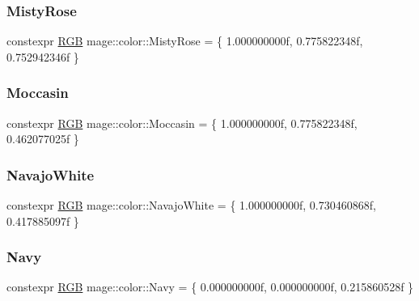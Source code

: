 \mbox{\label{namespacemage_1_1color_accc070278e15b17924142ac2cf2ffa7e}} 
\subsubsection{\texorpdfstring{Misty\+Rose}{MistyRose}}
{\footnotesize\ttfamily constexpr \mbox{\hyperlink{structmage_1_1_r_g_b}{R\+GB}} mage\+::color\+::\+Misty\+Rose = \{ 1.\+000000000f, 0.\+775822348f, 0.\+752942346f \}}

\mbox{\label{namespacemage_1_1color_ade191f43672b1ee280fbd53fed9d5558}} 
\subsubsection{\texorpdfstring{Moccasin}{Moccasin}}
{\footnotesize\ttfamily constexpr \mbox{\hyperlink{structmage_1_1_r_g_b}{R\+GB}} mage\+::color\+::\+Moccasin = \{ 1.\+000000000f, 0.\+775822348f, 0.\+462077025f \}}

\mbox{\label{namespacemage_1_1color_a900d3e18327610b3a28909a4e2e0f28a}} 
\subsubsection{\texorpdfstring{Navajo\+White}{NavajoWhite}}
{\footnotesize\ttfamily constexpr \mbox{\hyperlink{structmage_1_1_r_g_b}{R\+GB}} mage\+::color\+::\+Navajo\+White = \{ 1.\+000000000f, 0.\+730460868f, 0.\+417885097f \}}

\mbox{\label{namespacemage_1_1color_a61827d5a9d3b434155ba49592e474222}} 
\subsubsection{\texorpdfstring{Navy}{Navy}}
{\footnotesize\ttfamily constexpr \mbox{\hyperlink{structmage_1_1_r_g_b}{R\+GB}} mage\+::color\+::\+Navy = \{ 0.\+000000000f, 0.\+000000000f, 0.\+215860528f \}}

